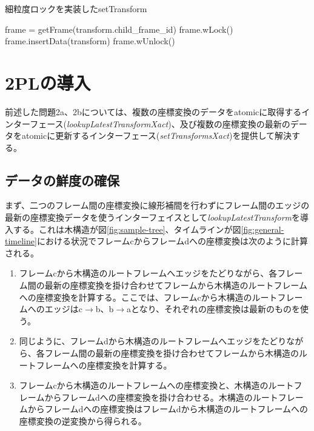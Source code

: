 \documentclass[a4paper]{jreport}	%
\begin{document}
\begin{algorithm}
\caption{細粒度ロックを実装したsetTransform}\label{algo:setTransform2}
\begin{algorithmic}[1]
	\State frame = getFrame(transform.child\_frame\_id)
	\State frame.wLock()
	\State frame.insertData(transform)
	\State frame.wUnlock()
	\EndProcedure
\end{algorithmic}
\end{algorithm}



\section{2PLの導入}
\label{section:intro-2pl}

前述した問題2a、2bについては、複数の座標変換のデータをatomicに取得するインターフェース(\textit{lookupLatestTransformXact})、及び複数の座標変換の最新のデータをatomicに更新するインターフェース(\textit{setTransformsXact})を提供して解決する。

\subsection{データの鮮度の確保}
まず、二つのフレーム間の座標変換に線形補間を行わずにフレーム間のエッジの最新の座標変換データを使うインターフェイスとして\textit{lookupLatestTransform}を導入する。これは木構造が図\ref{fig:sample-tree}、タイムラインが図\ref{fig:general-timeline}における状況でフレームcからフレームdへの座標変換は次のように計算される。

\begin{enumerate}
	\item フレームcから木構造のルートフレームへエッジをたどりながら、各フレーム間の最新の座標変換を掛け合わせてフレームから木構造のルートフレームへの座標変換を計算する。ここでは、フレームcから木構造のルートフレームへのエッジはc$\rightarrow$b、b$\rightarrow$aとなり、それぞれの座標変換は最新のものを使う。
	\item 同じように、フレームdから木構造のルートフレームへエッジをたどりながら、各フレーム間の最新の座標変換を掛け合わせてフレームから木構造のルートフレームへの座標変換を計算する。
	\item フレームcから木構造のルートフレームへの座標変換と、木構造のルートフレームからフレームdへの座標変換を掛け合わせる。木構造のルートフレームからフレームdへの座標変換はフレームdから木構造のルートフレームへの座標変換の逆変換から得られる。
\end{enumerate}
\end{document}
